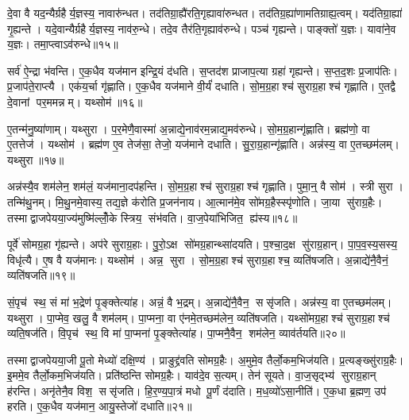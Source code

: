 दे॒वा वै यद॒न्यैर्ग्रहैर्य॒ज्ञस्य॒ नावारु॑न्धत। तद॑तिग्रा॒ह्यै॑रति॒गृह्यावा॑रुन्धत। तद॑तिग्र॒ह्या॑णामतिग्राह्य॒त्वम्। यद॑तिग्रा॒ह्या॑ गृ॒ह्यन्ते। यदे॒वान्यैर्ग्रहैर्य॒ज्ञस्य॒ नाव॑रु॒न्धे। तदे॒व तैर॑ति॒गृह्याव॑रुन्धे। पञ्च॑ गृह्यन्ते। पाङ्क्तो॑ य॒ज्ञः। यावा॑ने॒व य॒ज्ञः। तमा॒प्त्वाऽव॑रुन्धे॥१५॥

सर्व॑ ऐ॒न्द्रा भ॑वन्ति। ए॒क॒धैव यज॑मान इन्द्रि॒यं द॑धति। स॒प्तद॑श प्राजाप॒त्या ग्रहा॑ गृह्यन्ते। स॒प्त॒द॒शः प्र॒जाप॑तिः। प्र॒जाप॑ते॒राप्त्यै। एक॑य॒र्चा गृ॑ह्णाति। ए॒क॒धैव यज॑माने वी॒र्यं॑ दधाति। सो॒म॒ग्र॒हाश्च॑ सुराग्र॒हाश्च॑ गृह्णाति। ए॒तद्वै दे॒वानां पर॒ममन्नम्। यथ्सोम॑॥१६॥

ए॒तन्म॑नु॒ष्या॑णाम्। यथ्सुरा। प॒र॒मेणै॒वास्मा॑ अ॒न्नाद्ये॒नाव॑रम॒न्नाद्य॒मव॑रुन्धे। सो॒म॒ग्र॒हान्गृ॑ह्णाति। ब्रह्म॑णो॒ वा ए॒तत्तेज॑। यथ्सोम॑। ब्रह्म॑ण ए॒व तेज॑सा॒ तेजो॒ यज॑माने दधाति। सु॒रा॒ग्र॒हान्गृ॑ह्णाति। अन्न॑स्य॒ वा ए॒तच्छम॑लम्। यथ्सुरा॥१७॥

अन्न॑स्यै॒व शम॑लेन॒ शम॑लं॒ यज॑माना॒दप॑हन्ति। सो॒म॒ग्र॒हाश्च॑ सुराग्र॒हाश्च॑ गृह्णाति। पुमा॒न्॒ वै सोम॑। स्त्री सुरा। तन्मि॑थु॒नम्। मि॒थु॒नमे॒वास्य॒ तद्य॒ज्ञे क॑रोति प्र॒जन॑नाय। आ॒त्मान॑मे॒व सो॑मग्र॒हैस्स्पृ॑णोति। जा॒या सु॑राग्र॒हैः। तस्माद्वाजपेयया॒ज्य॑मुष्मि॑ल्लोँ॒के स्त्रिय॒ संभ॑वति। वा॒ज॒पेया॑भिजित॒ ह्य॑स्य॥१८॥

पूर्वे॑ सोमग्र॒हा गृ॑ह्यन्ते। अप॑रे सुराग्र॒हाः। पु॒रो॒ऽक्ष सो॑मग्र॒हान्थ्सा॑दयति। प॒श्चा॒द॒क्ष सु॑राग्र॒हान्। पा॒प॒व॒स्य॒सस्य॒ विधृ॑त्यै। ए॒ष वै यज॑मानः। यथ्सोम॑। अन्न॒ सुरा। सो॒म॒ग्र॒हाश्च॑ सुराग्र॒हाश्च॒ व्यति॑षजति। अ॒न्नाद्ये॑नै॒वैनं॒ व्यति॑षजति॥१९॥

सं॒पृच॑ स्थ॒ सं मा॑ भ॒द्रेण॑ पृ॒ङ्क्तेत्या॑ह। अन्नं॒ वै भ॒द्रम्। अ॒न्नाद्ये॑नै॒वैन॒ ससृ॑जति। अन्न॑स्य॒ वा ए॒तच्छम॑लम्। यथ्सुरा। पा॒प्मेव॒ खलु॒ वै शम॑लम्। पा॒प्मना॒ वा ए॑नमे॒तच्छम॑लेन॒ व्यति॑षजति। यथ्सो॑मग्र॒हाश्च॑ सुराग्र॒हाश्च॑ व्यति॒षज॑ति। वि॒पृच॑ स्थ॒ वि मा॑ पा॒प्मना॑ पृ॒ङ्क्तेत्या॑ह। पा॒प्मनै॒वैन॒ शम॑लेन॒ व्याव॑र्तयति॥२०॥

तस्माद्वाजपेयया॒जी पू॒तो मेध्यो॑ दक्षि॒ण्य॑। प्राङुद्द्र॑वति सोमग्र॒हैः। अ॒मुमे॒व तैर्लो॒कम॒भिज॑यति। प्र॒त्यङ्ख्सु॑राग्र॒हैः। इ॒ममे॒व तैर्लो॒कम॒भिज॑यति। प्रति॑ष्ठन्ति सोमग्र॒हैः। याव॑दे॒व स॒त्यम्। तेन॑ सूयते। वा॒ज॒सृद्भ्य॑ सुराग्र॒हान् ह॑रन्ति। अनृ॑तेनै॒व विश॒ ससृ॑जति। हि॒र॒ण्य॒पा॒त्रं मधोपू॒र्णं द॑दाति। म॒ध॒व्यो॑ऽसा॒नीति॑। ए॒क॒धा ब्र॒ह्मण॒ उप॑ हरति। ए॒क॒धैव यज॑मान॒ आयु॒स्तेजो॑ दधाति॥२१॥


